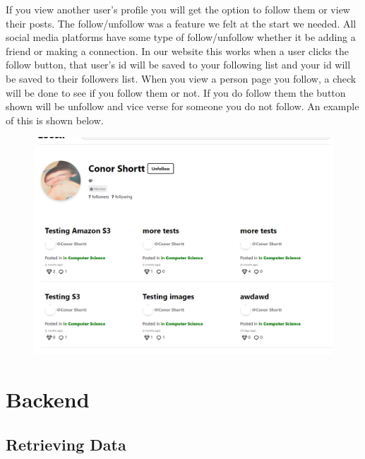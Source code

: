 If you view another user's profile you will get the option to follow them or view their posts. 
The follow/unfollow was a feature we felt at the start we needed. All social media platforms have some type of follow/unfollow whether it be adding a friend or making a connection. In our website this works when a user clicks the follow button, that user's id will be saved to your following list and your id will be saved to their followers list. When you view a person page you follow, a check will be done to see if you follow them or not. If you do follow them the button shown will be unfollow and vice verse for someone you do not follow. An example of this is shown below.
\begin{figure}[H]
  \centering
  \includegraphics[scale=0.4]{img/OtherProfile.PNG}
  \label{fig:OtherProfile}
\end{figure}

\section{Backend}

\subsection{Retrieving Data}

